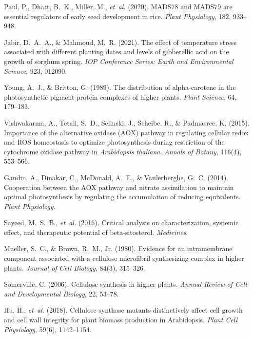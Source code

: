 \documentclass[10pt,letterpaper]{article}
\begin{document}
\begin{itemize}
\begin{thebibliography}{10}
Paul, P., Dhatt, B.~K., Miller, M., \emph{et~al.} (2020).  
MADS78 and MADS79 are essential regulators of early seed development in rice.  
\emph{Plant Physiology}, 182, 933–948.

Jabir, D.~A.~A., \& Mahmoud, M.~R. (2021).  
The effect of temperature stress associated with different planting dates and levels of gibberellic acid on the growth of sorghum spring.  
\emph{IOP Conference Series: Earth and Environmental Science}, 923, 012090.

Young, A.~J., \& Britton, G. (1989).
\newblock The distribution of alpha-carotene in the photosynthetic pigment-protein complexes of higher plants.
\newblock \emph{Plant Science}, 64, 179–183.

Vishwakarma, A., Tetali, S.~D., Selinski, J., Scheibe, R., \& Padmasree, K. (2015).
\newblock Importance of the alternative oxidase (AOX) pathway in regulating cellular redox and ROS homeostasis to optimize photosynthesis during restriction of the cytochrome oxidase pathway in \emph{Arabidopsis thaliana}.
\newblock \emph{Annals of Botany}, 116(4), 553–566.
\newblock {}

Gandin, A., Dinakar, C., McDonald, A.~E., \& Vanlerberghe, G.~C. (2014).
\newblock Cooperation between the AOX pathway and nitrate assimilation to maintain optimal photosynthesis by regulating the accumulation of reducing equivalents.
\newblock \emph{Plant Physiology}.
  
Sayeed, M.~S.~B., \emph{et~al.} (2016).  
Critical analysis on characterization, systemic effect, and therapeutic potential of beta‑sitosterol.  
\emph{Medicines}.

Mueller, S.~C., \& Brown, R.~M., Jr. (1980).  
Evidence for an intramembrane component associated with a cellulose microfibril synthesizing complex in higher plants.  
\emph{Journal of Cell Biology}, 84(3), 315–326.

Somerville, C. (2006).  
Cellulose synthesis in higher plants.  
\emph{Annual Review of Cell and Developmental Biology}, 22, 53–78.

Hu, H., \emph{et~al.} (2018).  
Cellulose synthase mutants distinctively affect cell growth and cell wall integrity for plant biomass production in Arabidopsis.  
\emph{Plant Cell Physiology}, 59(6), 1142–1154.


\end{thebibliography}
\end{itemize}
\end{document}
